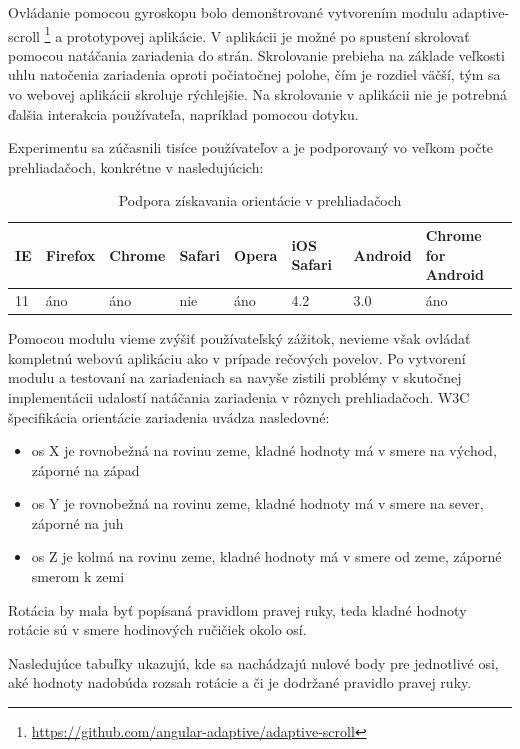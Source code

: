 Ovládanie pomocou gyroskopu bolo demonštrované vytvorením modulu adaptive-scroll \footnote{\url{https://github.com/angular-adaptive/adaptive-scroll}} a prototypovej aplikácie. V aplikácii je možné po spustení skrolovať pomocou natáčania zariadenia do strán. Skrolovanie prebieha na základe veľkosti uhlu natočenia zariadenia oproti počiatočnej polohe, čím je rozdiel väčší, tým sa vo webovej aplikácii skroluje rýchlejšie. Na skrolovanie v aplikácii nie je potrebná ďalšia interakcia používateľa, napríklad pomocou dotyku. 

Experimentu sa zúčasnili tisíce používateľov a je podporovaný vo veľkom počte prehliadačoch, konkrétne v nasledujúcich:

\begin{table}[H]
  \begin{tabular}{ | l | l | l | l | l | l | l | l |}
    \hline
    IE & Firefox & Chrome & Safari & Opera & iOS Safari & Android & Chrome for Android \\ \hline
    11 & áno & áno & nie & áno & 4.2 & 3.0 & áno  \\
    \hline
  \end{tabular}
  \caption[Podpora získavania orientácie v prehliadačoch]{Podpora získavania orientácie v prehliadačoch}
\end{table}

Pomocou modulu vieme zvýšiť používateľský zážitok, nevieme však ovládať kompletnú webovú aplikáciu ako v prípade rečových povelov. Po vytvorení modulu a testovaní na zariadeniach sa navyše zistili problémy v skutočnej implementácii udalostí natáčania zariadenia v rôznych prehliadačoch. W3C špecifikácia orientácie zariadenia uvádza nasledovné:

\begin{itemize}
  \item os X je rovnobežná na rovinu zeme, kladné hodnoty má v smere na východ, záporné na západ
  \item os Y je rovnobežná na rovinu zeme, kladné hodnoty má v smere na sever, záporné na juh
  \item os Z je kolmá na rovinu zeme, kladné hodnoty má v smere od zeme, záporné smerom k zemi
\end{itemize}

Rotácia by mala byť popísaná pravidlom pravej ruky, teda kladné hodnoty rotácie sú v smere hodinových ručičiek okolo osí.

Nasledujúce tabuľky ukazujú, kde sa nachádzajú nulové body pre jednotlivé osi, aké hodnoty nadobúda rozsah rotácie a či je dodržané pravidlo pravej ruky.

